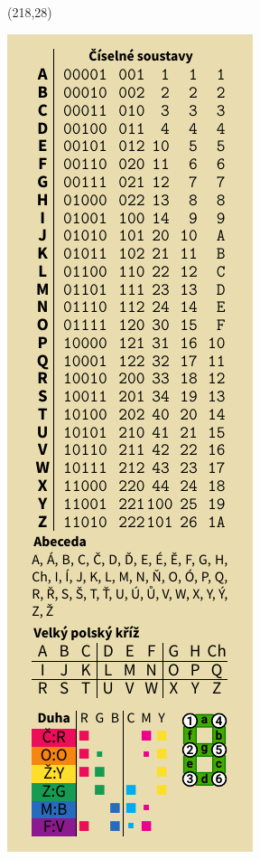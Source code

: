 \documentclass{extarticle}
\begin{document}
\begin{textblock}{42}(218,28)
\vfill
{\centerline{\includegraphics[scale=1,]{back.pdf}}} 
\vfill
\end{textblock}
\end{document}
